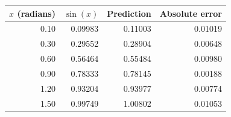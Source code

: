 \begin{tabular}{rrrr}
\toprule
$x$ (radians) & $\sin(x)$ & Prediction & Absolute error\\
\midrule
0.10 & 0.09983 & 0.11003 & 0.01019\\[1mm]
0.30 & 0.29552 & 0.28904 & 0.00648\\[1mm]
0.60 & 0.56464 & 0.55484 & 0.00980\\[1mm]
0.90 & 0.78333 & 0.78145 & 0.00188\\[1mm]
1.20 & 0.93204 & 0.93977 & 0.00774\\[1mm]
1.50 & 0.99749 & 1.00802 & 0.01053\\[1mm]
\bottomrule
\end{tabular}
